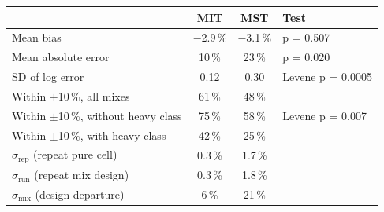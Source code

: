 \begin{tabular}{lccl}
\toprule
 & MIT & MST & Test \\
\midrule
Mean bias & \ensuremath{-}2.9\,\% & \ensuremath{-}3.1\,\% & p = 0.507 \\
Mean absolute error & 10\,\% & 23\,\% & p = 0.020 \\
SD of log error & 0.12 & 0.30 & Levene p = 0.0005 \\
Within $\pm$10\,\%, all mixes & 61\,\% & 48\,\% &  \\
Within $\pm$10\,\%, without heavy class & 75\,\% & 58\,\% & Levene p = 0.007 \\
Within $\pm$10\,\%, with heavy class & 42\,\% & 25\,\% &  \\
$\sigma_{\mathrm{rep}}$ (repeat pure cell) & 0.3\,\% & 1.7\,\% &  \\
$\sigma_{\mathrm{run}}$ (repeat mix design) & 0.3\,\% & 1.8\,\% &  \\
$\sigma_{\mathrm{mix}}$ (design departure) & 6\,\% & 21\,\% &  \\
\bottomrule
\end{tabular}
